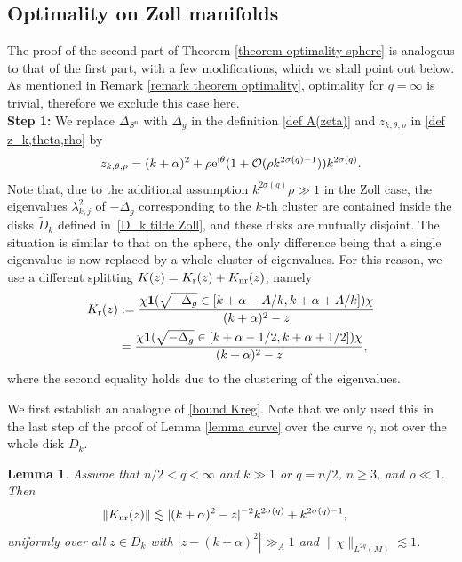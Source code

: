 \documentclass[12pt]{amsart}
\newcommand{\e}{{\rm e}}
\newcommand\I{\mathrm{i}}
\newtheorem{lemma}[theorem]{Lemma}
\begin{document}
\subsection{Optimality on Zoll manifolds}
The proof of the second part of Theorem \ref{theorem optimality sphere} is analogous to that of the first part, with a few modifications, which we shall point out below. As mentioned in Remark \ref{remark theorem optimality}, optimality for $q=\infty$ is trivial, therefore we exclude this case here.\\

\textbf{Step 1:} We replace $\Delta_{S^n}$ with $\Delta_g$ in the definition \eqref{def A(zeta)} and $z_{k,\theta,\rho}$ in \eqref{def z_k,theta,rho} by
\begin{align}
   z_{k,\theta,\rho}=(k+\alpha)^2+\rho\e^{\I\theta}(1+\mathcal{O}(\rho k^{2\sigma(q)-1})) k^{2\sigma(q)}.
\end{align}
Note that, due to the additional assumption $k^{2\sigma(q)}\rho\gg 1$ in the Zoll case, the eigenvalues $\lambda_{k,j}^2$ of $-\Delta_g$ corresponding to the $k$-th cluster are contained inside the disks $\tilde{D}_k$ defined in~\eqref{D_k tilde Zoll}, and these disks are mutually disjoint. 
The situation is similar to that on the sphere, the only difference being that a single eigenvalue is now replaced by a whole cluster of eigenvalues. For this reason, we use a different splitting $K(z)=K_{\rm r}(z)+K_{\rm nr}(z)$, namely
\begin{align}\label{def K_r Zoll}
 K_{\rm r}(z)&:=\frac{\chi\mathbf{1}(\sqrt{-\Delta_g}\in[k+\alpha-A/k,k+\alpha+  A/k])\chi}{(k+\alpha)^2-z}\\
 &=\frac{\chi\mathbf{1}(\sqrt{-\Delta_g}\in[k+\alpha-1/2,k+\alpha+1/2])\chi}{(k+\alpha)^2-z},
 \end{align}
 where the second equality holds due to the clustering of the eigenvalues.

 We first establish an analogue of \eqref{bound Kreg}. Note that we only used this in the last step of the proof of Lemma \ref{lemma curve} over the curve $\gamma$, not over the whole disk $D_k$.

 
\begin{lemma}\label{lemma Zoll}
Assume that $n/2<q<\infty$ and $k\gg 1$ or $q=n/2$, $n\geq 3$, and $\rho\ll 1$. Then
    \begin{align}\label{bound Knr Zoll}
    \|K_{\rm nr}(z)\|&\lesssim |(k+\alpha)^2-z|^{-2}k^{2\sigma(q)}+k^{2\sigma(q)-1},
\end{align}
uniformly over all $z\in \tilde{D}_k$ with $|z-(k+\alpha)^2|\gg_A 1$ and $\|\chi\|_{L^{2q}(M)}\lesssim 1$.
\end{lemma} 
\end{document}
